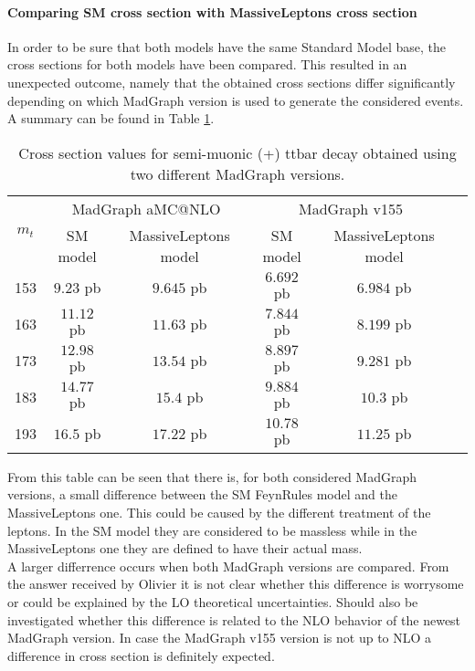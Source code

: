 \paragraph{Comparing SM cross section with MassiveLeptons cross section\\}
In order to be sure that both models have the same Standard Model base, the cross sections for both models have been compared. This resulted in an unexpected outcome, namely that the obtained cross sections differ significantly depending on which MadGraph version is used to generate the considered events. A summary can be found in Table \ref{table::MGXS}.
\begin{table}[h!]
 \centering
 \begin{tabular}{|c|c|c|c|c|c|}
  \hline
  \multirow{2}{*}{$m_{t}$}	&  \multicolumn{2}{|c|}{MadGraph aMC@NLO}	& \multicolumn{2}{|c|}{MadGraph v155}  	\\
				&  SM model	& MassiveLeptons model		& SM model 	& MassiveLeptons model	\\
  \hline
    153 			& $9.23$ pb	& $9.645$ pb			& $6.692$ pb	& $6.984$ pb		\\
    163				& $11.12$ pb	& $11.63$ pb			& $7.844$ pb	& $8.199$ pb		\\
    173				& $12.98$ pb	& $13.54$ pb			& $8.897$ pb	& $9.281$ pb		\\
    183				& $14.77$ pb	& $15.4$ pb			& $9.884$ pb	& $10.3$ pb		\\
    193				& $16.5$ pb	& $17.22$ pb			& $10.78$ pb	& $11.25$ pb		\\
  \hline 
 \end{tabular} 
 \caption{Cross section values for semi-muonic (+) ttbar decay obtained using two different MadGraph versions.} \label{table::MGXS}
\end{table}

From this table can be seen that there is, for both considered MadGraph versions, a small difference between the SM FeynRules model and the MassiveLeptons one. This could be caused by the different treatment of the leptons. In the SM model they are considered to be massless while in the MassiveLeptons one they are defined to have their actual mass.\\
A larger differrence occurs when both MadGraph versions are compared. From the answer received by Olivier it is not clear whether this difference is worrysome or could be explained by the LO theoretical uncertainties. Should also be investigated whether this difference is related to the NLO behavior of the newest MadGraph version. In case the MadGraph v155 version is not up to NLO a difference in cross section is definitely expected.

